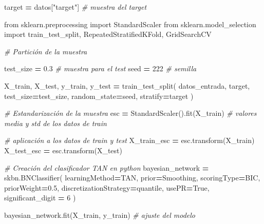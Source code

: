 \documentclass[
  a4paper,
  DIV=11,
  numbers=noendperiod]{scrreprt}
\newenvironment{Shaded}{\begin{snugshade}}{\end{snugshade}}
\newcommand{\CommentTok}[1]{\textcolor[rgb]{0.56,0.35,0.01}{\textit{#1}}}
\newcommand{\DecValTok}[1]{\textcolor[rgb]{0.00,0.00,0.81}{#1}}
\newcommand{\FloatTok}[1]{\textcolor[rgb]{0.00,0.00,0.81}{#1}}
\newcommand{\ImportTok}[1]{#1}
\newcommand{\NormalTok}[1]{#1}
\newcommand{\OperatorTok}[1]{\textcolor[rgb]{0.81,0.36,0.00}{\textbf{#1}}}
\newcommand{\StringTok}[1]{\textcolor[rgb]{0.31,0.60,0.02}{#1}}
\newcommand{\VariableTok}[1]{\textcolor[rgb]{0.00,0.00,0.00}{#1}}
\begin{document}
\begin{Shaded}
\begin{Highlighting}[numbers=left,,]
\NormalTok{target }\OperatorTok{=}\NormalTok{ datos[}\StringTok{"target"}\NormalTok{] }\CommentTok{\# muestra del target}

\ImportTok{from}\NormalTok{ sklearn.preprocessing }\ImportTok{import}\NormalTok{ StandardScaler}
\ImportTok{from}\NormalTok{ sklearn.model\_selection }\ImportTok{import}\NormalTok{ train\_test\_split, RepeatedStratifiedKFold, GridSearchCV}

\CommentTok{\# Partición de la muestra}

\NormalTok{test\_size }\OperatorTok{=} \FloatTok{0.3} \CommentTok{\# muestra para el test }
\NormalTok{seed }\OperatorTok{=} \DecValTok{222} \CommentTok{\# semilla}

\NormalTok{X\_train, X\_test, y\_train, y\_test }\OperatorTok{=}\NormalTok{ train\_test\_split(}
\NormalTok{    datos\_entrada, target, test\_size}\OperatorTok{=}\NormalTok{test\_size, random\_state}\OperatorTok{=}\NormalTok{seed, stratify}\OperatorTok{=}\NormalTok{target}
\NormalTok{)}

\CommentTok{\# Estandarización de la muestra}
\NormalTok{esc }\OperatorTok{=}\NormalTok{ StandardScaler().fit(X\_train) }\CommentTok{\# valores media y std de los datos de train}

\CommentTok{\# aplicación a los datos de train y test}
\NormalTok{X\_train\_esc }\OperatorTok{=}\NormalTok{ esc.transform(X\_train)}
\NormalTok{X\_test\_esc }\OperatorTok{=}\NormalTok{ esc.transform(X\_test)}
\end{Highlighting}
\end{Shaded}

\begin{Shaded}
\begin{Highlighting}[numbers=left,,]
\CommentTok{\# Creación del clasificador TAN en python}
\NormalTok{bayesian\_network }\OperatorTok{=}\NormalTok{ skbn.BNClassifier(}
\NormalTok{    learningMethod}\OperatorTok{=}\StringTok{\textquotesingle{}TAN\textquotesingle{}}\NormalTok{,}
\NormalTok{    prior}\OperatorTok{=}\StringTok{\textquotesingle{}Smoothing\textquotesingle{}}\NormalTok{,}
\NormalTok{    scoringType}\OperatorTok{=}\StringTok{\textquotesingle{}BIC\textquotesingle{}}\NormalTok{,}
\NormalTok{    priorWeight}\OperatorTok{=}\FloatTok{0.5}\NormalTok{,}
\NormalTok{    discretizationStrategy}\OperatorTok{=}\StringTok{\textquotesingle{}quantile\textquotesingle{}}\NormalTok{,}
\NormalTok{    usePR}\OperatorTok{=}\VariableTok{True}\NormalTok{,}
\NormalTok{    significant\_digit }\OperatorTok{=} \DecValTok{6}
\NormalTok{)}

\NormalTok{bayesian\_network.fit(X\_train, y\_train) }\CommentTok{\# ajuste del modelo}
\end{Highlighting}
\end{Shaded}
\end{document}
